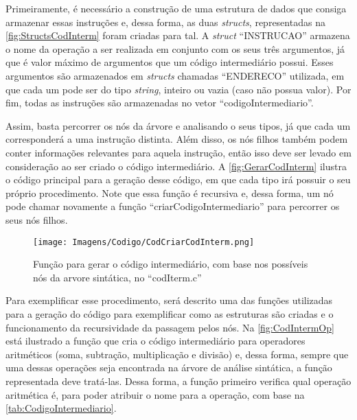 \documentclass[
	12pt,				%
	oneside,
	a4paper,			%
	english,			%
	french,				%
	spanish,			%
	brazil,				%
	]{abntex2}
\begin{document}
Primeiramente, é necessário a construção de uma estrutura de dados que consiga armazenar essas instruções e, dessa forma, as duas \emph{structs}, representadas na \autoref{fig:StructsCodInterm} foram criadas para tal. A \emph{struct} ``INSTRUCAO'' armazena o nome da operação a ser realizada em conjunto com os seus três argumentos, já que é valor máximo de argumentos que um código intermediário possui. Esses argumentos são armazenados em \emph{structs} chamadas ``ENDERECO'' utilizada, em que cada um pode ser do tipo \emph{string}, inteiro ou vazia (caso não possua valor). Por fim, todas as instruções são armazenadas no vetor ``codigoIntermediario''.


Assim, basta percorrer os nós da árvore e analisando o seus tipos, já que cada um corresponderá a uma instrução distinta. Além disso, os nós filhos também podem conter informações relevantes para aquela instrução, então isso deve ser levado em consideração ao ser criado o código intermediário. A \autoref{fig:GerarCodInterm} ilustra o código principal para a geração desse código, em que cada tipo irá possuir o seu próprio procedimento. Note que essa função é recursiva e, dessa forma, um nó pode chamar novamente a função ``criarCodigoIntermediario'' para percorrer os seus nós filhos. 

\begin{figure}[H]
\centering 
\caption{Função para gerar o código intermediário, com base nos possíveis nós da arvore sintática, no \nohyphens{``codIterm.c''}} 
\label{fig:GerarCodInterm}
\graphicspath{ {./Imagens/} } 
\texttt{[image: Imagens/Codigo/CodCriarCodInterm.png]}
\end{figure}


Para exemplificar esse procedimento, será descrito uma das funções utilizadas para a geração do código para exemplificar como as estruturas são criadas e o funcionamento da recursividade da passagem pelos nós. Na \autoref{fig:CodIntermOp} está ilustrado a função que cria o código intermediário para operadores aritméticos (soma, subtração, multiplicação e divisão) e, dessa forma, sempre que uma dessas operações seja encontrada na árvore de análise sintática, a função representada deve tratá-las. Dessa forma, a função primeiro verifica qual operação aritmética é, para poder atribuir o nome para a operação, com base na \autoref{tab:CodigoIntermediario}. 
\end{document}
